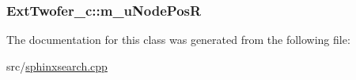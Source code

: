 \hypertarget{classExtTwofer__c_a1e25ea1d556b0a7345cc7d191910cb83}{
\subsubsection[{m\-\_\-u\-Node\-Pos\-R}]{ Ext\-Twofer\-\_\-c\-::m\-\_\-u\-Node\-Pos\-R\hspace{0.3cm}{\ttfamily [protected]}}}\label{classExtTwofer__c_a1e25ea1d556b0a7345cc7d191910cb83}


The documentation for this class was generated from the following file\-:\begin{DoxyCompactItemize}
\item 
src/\hyperlink{sphinxsearch_8cpp}{sphinxsearch.\-cpp}\end{DoxyCompactItemize}
